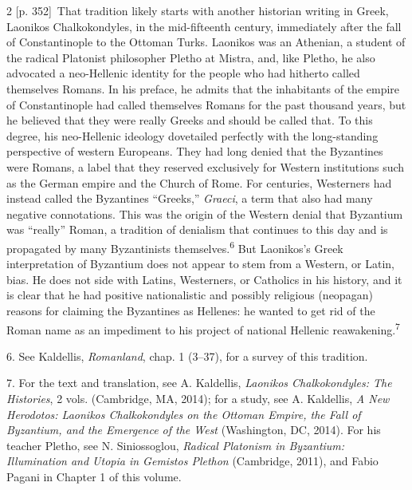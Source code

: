 \documentclass[10pt,a4paper]{article}
\begin{document}
\begin{paracol}{2}
{\scriptsize\color{gray}[p. 352]}\ That tradition likely starts with another historian writing in Greek, Laonikos Chalkokondyles, in the mid-fifteenth century, immediately after the fall of Constantinople to the Ottoman Turks. Laonikos was an Athenian, a student of the radical Platonist philosopher Pletho at Mistra, and, like Pletho, he also advocated a neo-Hellenic identity for the people who had hitherto called themselves Romans. In his preface, he admits that the inhabitants of the empire of Constantinople had called themselves Romans for the past thousand years, but he believed that they were really Greeks and should be called that. To this degree, his neo-Hellenic ideology dovetailed perfectly with the long-standing perspective of western Europeans. They had long denied that the Byzantines were Romans, a label that they reserved exclusively for Western institutions such as the German empire and the Church of Rome. For centuries, Westerners had instead called the Byzantines “Greeks,” \textit{Graeci}, a term that also had many negative connotations. This was the origin of the Western denial that Byzantium was “really” Roman, a tradition of denialism that continues to this day and is propagated by many Byzantinists themselves.\nobreak\textsuperscript{6} But Laonikos’s Greek interpretation of Byzantium does not appear to stem from a Western, or Latin, bias. He does not side with Latins, Westerners, or Catholics in his history, and it is clear that he had positive nationalistic and possibly religious (neopagan) reasons for claiming the Byzantines as Hellenes: he wanted to get rid of the Roman name as an impediment to his project of national Hellenic reawakening.\nobreak\textsuperscript{7}\par{\small 6.  See Kaldellis, \textit{Romanland}, chap. 1 (3–37), for a survey of this tradition.\par}{\small 7.  For the text and translation, see A. Kaldellis, \textit{Laonikos Chalkokondyles: The Histories}, 2 vols. (Cambridge, MA, 2014); for a study, see A. Kaldellis, \textit{A New Herodotos: Laonikos Chalkokondyles on the Ottoman Empire, the Fall of Byzantium, and the Emergence of the West} (Washington, DC, 2014). For his teacher Pletho, see N. Siniossoglou, \textit{Radical Platonism in Byzantium: Illumination and Utopia in Gemistos Plethon} (Cambridge, 2011), and Fabio Pagani in Chapter 1 of this volume.\par}
\switchcolumn*

\end{paracol}
\end{document}

